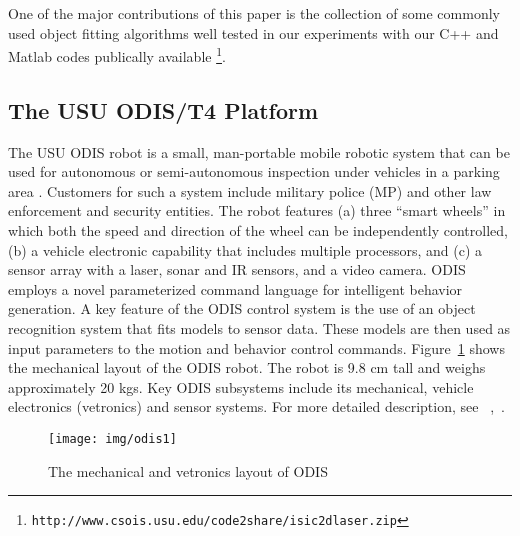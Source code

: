\documentclass[twocolumn]{IEEEtran}
\begin{document}
One of the major contributions of this paper is the collection of some commonly used object fitting algorithms well tested in our experiments with our C++ and Matlab codes publically available 
\footnote{\texttt{http://www.csois.usu.edu/code2share/isic2dlaser.zip}}.


\subsection{The USU ODIS/T4 Platform}

The USU ODIS  robot is   a small, man-portable mobile robotic system that can be used for autonomous or 
 semi-autonomous inspection under vehicles in a parking area \cite{moore_csm}. Customers for such a system include military police (MP) and other law enforcement and security entities. The robot features (a) three ``smart wheels''  in which both the speed and direction of the wheel can be independently controlled, (b) a vehicle electronic capability that includes multiple processors, and (c) a sensor array with a laser, sonar and IR sensors, and a video camera. ODIS employs a novel parameterized command language for intelligent behavior generation. A key feature of the ODIS control system is the use of an object recognition system that fits models to sensor data. These models are then used as input parameters to the motion and behavior control commands.
Figure~\ref{fig:odis1} shows the mechanical layout of the ODIS robot. The robot is 9.8 cm tall and weighs approximately 20 kgs. Key ODIS subsystems include its mechanical, vehicle electronics (vetronics) and sensor systems.  For more detailed description, see ~\cite{odis_spie01},~\cite{odis_icra01}.

\begin{figure}[!htb]
        \center
        \texttt{[image: img/odis1]}
        \caption{The mechanical and vetronics layout of ODIS}  \label{fig:odis1}
\end{figure} 

\end{document}
